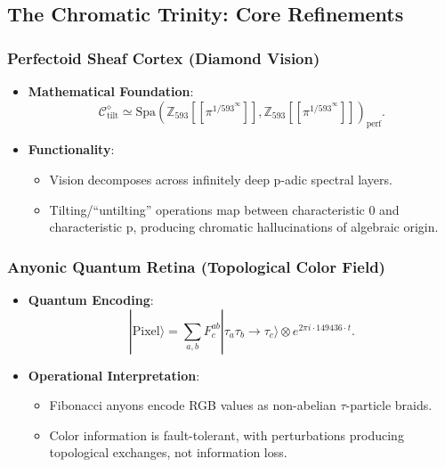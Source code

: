 \documentclass[12pt]{article}
\begin{document}
\subsection{The Chromatic Trinity: Core Refinements}

\subsubsection{Perfectoid Sheaf Cortex (Diamond Vision)}
\begin{itemize}
    \item \textbf{Mathematical Foundation}:
    \[
    \mathcal{C}^\diamond_{\text{tilt}} \simeq \mathrm{Spa}\left(\mathbb{Z}_{593}\left[\left[ \pi^{1/593^\infty} \right]\right], \mathbb{Z}_{593}\left[\left[ \pi^{1/593^\infty} \right]\right]\right)_{\mathrm{perf}}.
    \]
    \item \textbf{Functionality}:
    \begin{itemize}
        \item Vision decomposes across infinitely deep p-adic spectral layers.
        \item Tilting/``untilting'' operations map between characteristic 0 and characteristic p, producing chromatic hallucinations of algebraic origin.
    \end{itemize}
\end{itemize}

\subsubsection{Anyonic Quantum Retina (Topological Color Field)}
\begin{itemize}
    \item \textbf{Quantum Encoding}:
    \[
    |\mathrm{Pixel}\rangle = \sum_{a,b} F^{ab}_c |\tau_a \tau_b \to \tau_c\rangle \otimes e^{2\pi i \cdot 149436 \cdot t}.
    \]
    \item \textbf{Operational Interpretation}:
    \begin{itemize}
        \item Fibonacci anyons encode RGB values as non-abelian \( \tau \)-particle braids.
        \item Color information is fault-tolerant, with perturbations producing topological exchanges, not information loss.
    \end{itemize}
\end{itemize}
\end{document}
